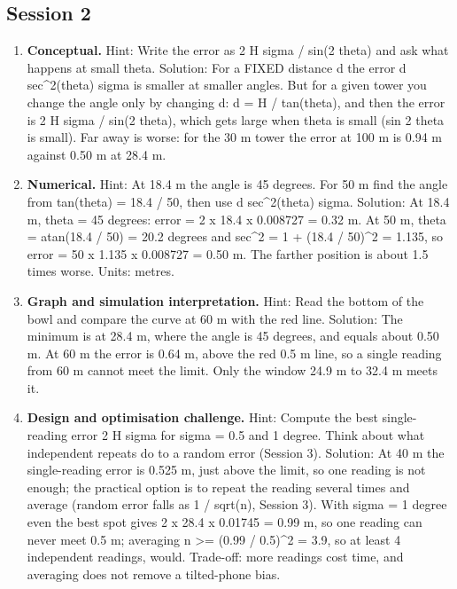 \documentclass[11pt,a4paper]{article}
\begin{document}
\subsection*{Session 2}
\begin{enumerate}[nosep]
\item \textbf{Conceptual.} Hint: Write the error as 2 H sigma / sin(2 theta) and ask what happens at small theta. Solution: For a FIXED distance d the error d sec\textasciicircum{}2(theta) sigma is smaller at smaller angles. But for a given tower you change the angle only by changing d: d = H / tan(theta), and then the error is 2 H sigma / sin(2 theta), which gets large when theta is small (sin 2 theta is small). Far away is worse: for the 30 m tower the error at 100 m is 0.94 m against 0.50 m at 28.4 m.
\item \textbf{Numerical.} Hint: At 18.4 m the angle is 45 degrees. For 50 m find the angle from tan(theta) = 18.4 / 50, then use d sec\textasciicircum{}2(theta) sigma. Solution: At 18.4 m, theta = 45 degrees: error = 2 x 18.4 x 0.008727 = 0.32 m. At 50 m, theta = atan(18.4 / 50) = 20.2 degrees and sec\textasciicircum{}2 = 1 + (18.4 / 50)\textasciicircum{}2 = 1.135, so error = 50 x 1.135 x 0.008727 = 0.50 m. The farther position is about 1.5 times worse. Units: metres.
\item \textbf{Graph and simulation interpretation.} Hint: Read the bottom of the bowl and compare the curve at 60 m with the red line. Solution: The minimum is at 28.4 m, where the angle is 45 degrees, and equals about 0.50 m. At 60 m the error is 0.64 m, above the red 0.5 m line, so a single reading from 60 m cannot meet the limit. Only the window 24.9 m to 32.4 m meets it.
\item \textbf{Design and optimisation challenge.} Hint: Compute the best single-reading error 2 H sigma for sigma = 0.5 and 1 degree. Think about what independent repeats do to a random error (Session 3). Solution: At 40 m the single-reading error is 0.525 m, just above the limit, so one reading is not enough; the practical option is to repeat the reading several times and average (random error falls as 1 / sqrt(n), Session 3). With sigma = 1 degree even the best spot gives 2 x 28.4 x 0.01745 = 0.99 m, so one reading can never meet 0.5 m; averaging n \textgreater{}= (0.99 / 0.5)\textasciicircum{}2 = 3.9, so at least 4 independent readings, would. Trade-off: more readings cost time, and averaging does not remove a tilted-phone bias.
\end{enumerate}
\end{document}
